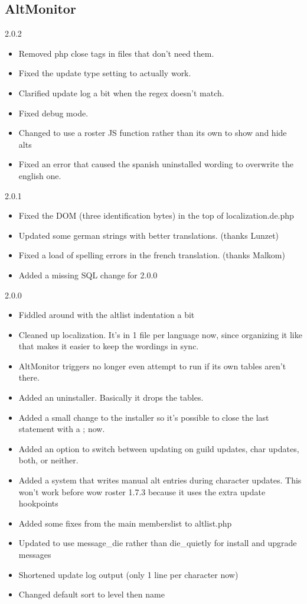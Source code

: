 \documentclass[12pt, a4paper]{article}
\begin{document}
\subsection{AltMonitor}
\begin{description}
\item{2.0.2}
\begin{itemize}
\item Removed php close tags in files that don't need them.
\item Fixed the update type setting to actually work.
\item Clarified update log a bit when the regex doesn't match.
\item Fixed debug mode.
\item Changed to use a roster JS function rather than its own to show and hide alts
\item Fixed an error that caused the spanish uninstalled wording to overwrite the
   english one.
\end{itemize}

\item{2.0.1}
\begin{itemize}
\item Fixed the DOM (three identification bytes) in the top of localization.de.php
\item Updated some german strings with better translations. (thanks Lunzet)
\item Fixed a load of spelling errors in the french translation. (thanks Malkom)
\item Added a missing SQL change for 2.0.0
\end{itemize}

\item{2.0.0}
\begin{itemize}
\item Fiddled around with the altlist indentation a bit
\item Cleaned up localization. It's in 1 file per language now, since organizing
   it like that makes it easier to keep the wordings in sync.
\item AltMonitor triggers no longer even attempt to run if its own tables
   aren't there.
\item Added an uninstaller. Basically it drops the tables.
\item Added a small change to the installer so it's possible to close the last
   statement with a ; now.
\item Added an option to switch between updating on guild updates, char updates,
   both, or neither.
\item Added a system that writes manual alt entries during character updates.
   This won't work before wow roster 1.7.3 because it uses the extra update
   hookpoints
\item Added some fixes from the main memberslist to altlist.php
\item Updated to use message\_die rather than die\_quietly for install and upgrade
   messages
\item Shortened update log output (only 1 line per character now)
\item Changed default sort to level then name
\end{itemize}


\end{description}
\end{document}
